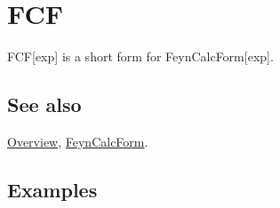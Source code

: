 \documentclass[../FeynCalcManual.tex]{subfiles}
\begin{document}
\hypertarget{fcf}{
\section{FCF}\label{fcf}}

FCF{[}exp{]} is a short form for FeynCalcForm{[}exp{]}.

\subsection{See also}

\hyperlink{toc}{Overview}, \hyperlink{feyncalcform}{FeynCalcForm}.

\subsection{Examples}
\end{document}
